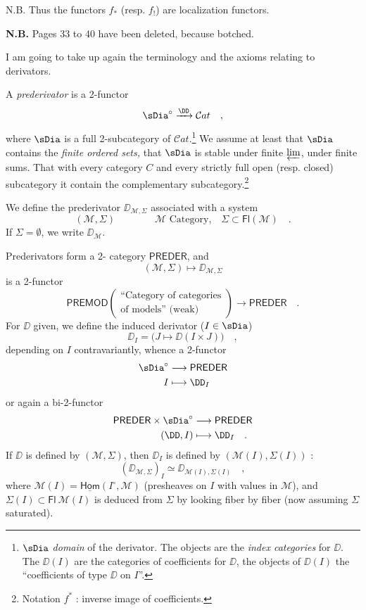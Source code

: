 N.B. Thus the functors $f_*$ (resp. $f_!$) are localization functors.

\textbf{N.B.} Pages 33 to 40 have been deleted, because botched. %

I am going to take up again the terminology and the axioms relating to derivators.

A \textit{prederivator} is a 2-functor
\[ \sDia^\circ \xrightarrow{\DD} \mathcal{C}at \quad , \]
where $\sDia$ is a full 2-subcategory of $\mathcal{C}at$.\footnote[11]{$\sDia$ \textit{domain} of the derivator. The objects are the \textit{index categories} for $\DD$. The $\DD(I)$ are the categories of coefficients for $\DD$, the objects of $\DD(I)$ the ``coefficients of type $\DD$ on $I$''. %
} We assume at least that $\sDia$ contains the \textit{finite ordered sets,} that $\sDia$ is stable under finite $\varprojlim$, under finite sums. That with every category $C$ and every strictly full open (resp. closed) subcategory it contain the complementary subcategory.\footnote[12]{Notation $f^*$ : inverse image of coefficients.}

We define the prederivator $\DD_{\mathcal{M},\Sigma}$ associated with a system
\[ (\mathcal{M},\Sigma) \qquad\qquad \mathcal{M} \text{ Category,} \quad \Sigma \subset \mathsf{Fl}(\mathcal{M}) \quad . \] %
If $\Sigma = \emptyset$, we write $\DD_{\mathcal{M}}$.

Prederivators form a 2- category $\mathsf{PREDER}$, and
\[ (\mathcal{M},\Sigma) \longmapsto \DD_{\mathcal{M},\Sigma} \]
is a 2-functor
\[ \mathsf{PREMOD}
\begin{pmatrix}
\text{``Category of categories} \\
\text{of models'' (weak)}
\end{pmatrix}
\longrightarrow \mathsf{PREDER} \quad . \]
For $\DD$ given, we define the induced derivator ($I \in \sDia$)
\[ \DD_I = \big(J \longmapsto \DD(I \times J)\big) \quad , \]
depending on $I$ contravariantly, whence a 2-functor
\[ \begin{aligned}
\sDia^\circ &\longrightarrow \mathsf{PREDER} \\
I &\longmapsto \DD_I
\end{aligned} \]
or again a bi-2-functor
\[ \begin{aligned}
\mathsf{PREDER} \times \sDia^\circ &\longrightarrow \mathsf{PREDER} \\
(\DD, I) &\longmapsto \DD_I \quad .
\end{aligned} \]
If $\DD$ is defined by $(\mathcal{M},\Sigma)$, then $\DD_I$ is defined by $(\mathcal{M}(I),\Sigma(I))$ :
\[ (\DD_{\mathcal{M},\Sigma})_I \simeq \DD_{\mathcal{M}(I),\Sigma(I)} \quad , \]
where $\mathcal{M}(I) = \underline{\mathsf{Hom}}(I^\circ,\mathcal{M})$ (presheaves on $I$ with values in $\mathcal{M}$), and $\Sigma(I) \subset \mathsf{Fl}\ \mathcal{M}(I)$ is deduced from $\Sigma$ by looking fiber by fiber (now assuming $\Sigma$ saturated). %

